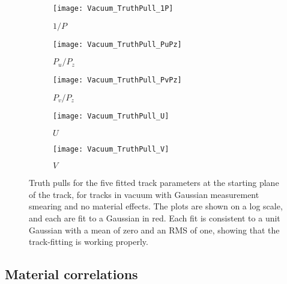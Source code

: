     \begin{figure}
    \centering
        \begin{subfigure}[t]{0.45\textwidth}
            \centering
            \texttt{[image: Vacuum\_TruthPull\_1P]}
            \caption{$1/P$}
        \end{subfigure}%

        \vspace{2mm}
        \begin{subfigure}[t]{0.45\textwidth}
            \centering
            \texttt{[image: Vacuum\_TruthPull\_PuPz]}
            \caption{$P_{u}/P_{z}$}
        \end{subfigure}
        \begin{subfigure}[t]{0.45\textwidth}
            \centering
            \texttt{[image: Vacuum\_TruthPull\_PvPz]}
            \caption{$P_{v}/P_{z}$}
        \end{subfigure}%
        \vspace{2mm}
        \begin{subfigure}[t]{0.45\textwidth}
            \centering
            \texttt{[image: Vacuum\_TruthPull\_U]}
            \caption{$U$}
        \end{subfigure}
        \begin{subfigure}[t]{0.45\textwidth}
            \centering
            \texttt{[image: Vacuum\_TruthPull\_V]}
            \caption{$V$}
        \end{subfigure}%
    \caption[Track parameter truth pulls for fitted tracks in vacuum]{Truth pulls for the five fitted track parameters at the starting plane of the track, for tracks in vacuum with Gaussian measurement smearing and no material effects. The plots are shown on a log scale, and each are fit to a Gaussian in red. Each fit is consistent to a unit Gaussian with a mean of zero and an RMS of one, showing that the track-fitting is working properly.}
    \label{fig:VacuumTruthPulls}
    \end{figure}



\subsection{Material correlations}

